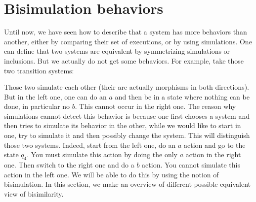 %	
%	
		


\section{Bisimulation behaviors}
\label{sec:bists}

Until now, we have seen how to describe that a system has more behaviors than another, either by comparing their set of executions, or by using simulations. One can define that two systems are equivalent by symmetrizing simulations or inclusions. But we actually do not get some behaviors. For example, take those two transition systems:

		\begin{figure}[H]
			\begin{center}
    				
  			\end{center}
		\end{figure}
	
Those two simulate each other (their are actually morphisms in both directions). But in the left one, one can do an $a$ and then be in a state where nothing can be done, in particular no $b$. This cannot occur in the right one. The reason why simulations cannot detect this behavior is because one first chooses a system and then tries to simulate its behavior in the other, while we would like to start in one, try to simulate it and then possibly change the system. This will distinguish those two systems. Indeed, start from the left one, do an $a$ action and go to the state $q_4$. You must simulate this action by doing the only $a$ action in the right one. Then switch to the right one and do a $b$ action. You cannot simulate this action in the left one. We will be able to do this by using the notion of bisimulation. In this section, we make an overview of different possible equivalent view of bisimilarity.


